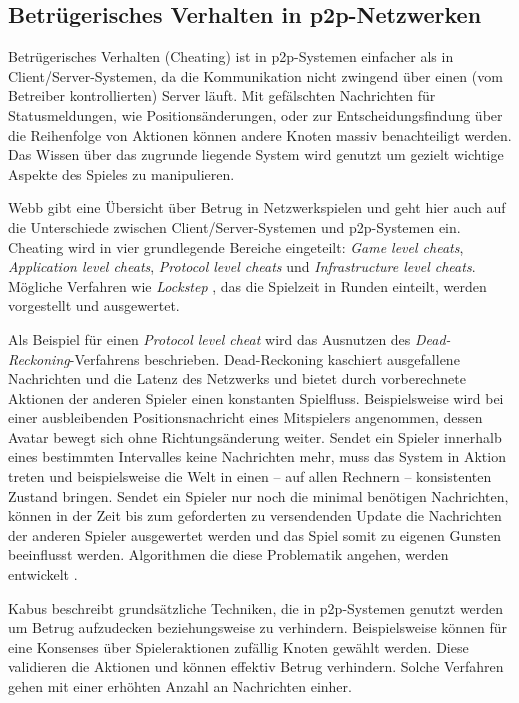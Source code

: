 \subsection{Betrügerisches Verhalten in p2p-Netzwerken}
\label{chap:grundlagen:cheating}
Betrügerisches Verhalten (Cheating) ist in p2p-Systemen einfacher als in Client/Server-Systemen, da die Kommunikation nicht zwingend über einen (vom Betreiber kontrollierten) Server läuft. Mit gefälschten Nachrichten für Statusmeldungen, wie Positionsänderungen, oder zur Entscheidungsfindung über die Reihenfolge von Aktionen können andere Knoten massiv benachteiligt werden. Das Wissen über das zugrunde liegende System wird genutzt um gezielt wichtige Aspekte des Spieles zu manipulieren.

Webb \cite{Webb2007Cheating} gibt eine Übersicht über Betrug in Netzwerkspielen und geht hier auch auf die Unterschiede zwischen Client/Server-Systemen und p2p-Systemen ein. Cheating wird in vier grundlegende Bereiche eingeteilt: \emph{Game level cheats}, \emph{Application level cheats}, \emph{Protocol level cheats} und \emph{Infrastructure level cheats}. Mögliche Verfahren wie \emph{Lockstep} \cite{Baughman2007}, das die Spielzeit in Runden einteilt, werden vorgestellt und ausgewertet.

Als Beispiel für einen \emph{Protocol level cheat} wird das Ausnutzen des \emph{Dead-Reckoning}-Verfahrens \cite{Pantel2002} beschrieben. Dead-Reckoning kaschiert ausgefallene Nachrichten und die Latenz des Netzwerks und bietet durch vorberechnete Aktionen der anderen Spieler einen konstanten Spielfluss. Beispielsweise wird bei einer ausbleibenden Positionsnachricht eines Mitspielers angenommen, dessen Avatar bewegt sich ohne Richtungsänderung weiter. Sendet ein Spieler innerhalb eines bestimmten Intervalles keine Nachrichten mehr, muss das System in Aktion treten und beispielsweise die Welt in einen -- auf allen Rechnern -- konsistenten Zustand bringen. Sendet ein Spieler nur noch die minimal benötigen Nachrichten, können in der Zeit bis zum geforderten zu versendenden Update die Nachrichten der anderen Spieler ausgewertet werden und das Spiel somit zu eigenen Gunsten beeinflusst werden. Algorithmen die diese Problematik angehen, werden entwickelt \cite{Aggarwal2005}.

Kabus \cite{Kabus2007Design, Kabus2009} beschreibt grundsätzliche Techniken, die in p2p-Systemen genutzt werden um Betrug aufzudecken beziehungsweise zu verhindern. Beispielsweise können für eine Konsenses über Spieleraktionen zufällig Knoten gewählt werden. Diese validieren die Aktionen und können effektiv Betrug verhindern. Solche Verfahren gehen mit einer erhöhten Anzahl an Nachrichten einher.


